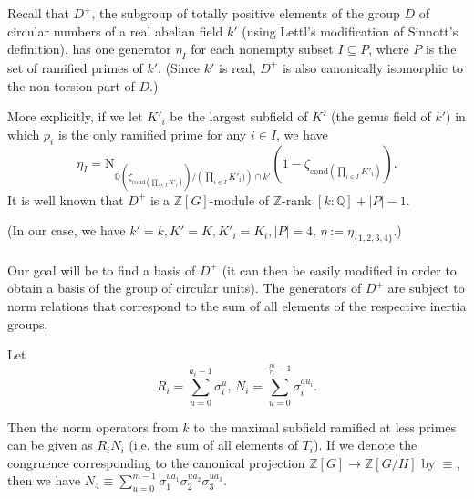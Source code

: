 \documentclass[12pt,a4paper]{article}
\newcommand{\Qbb}{\mathbb{Q}}
\newcommand{\Zbb}{\mathbb{Z}}
\newcommand{\Z}{\mathbb{Z}}
\begin{document}
Recall that $D^+$, the subgroup of totally positive elements of the group $D$ of circular numbers of a real abelian field $k'$ (using Lettl's modification of Sinnott's definition), has one generator $\eta_I$ for each nonempty subset $I\subseteq P$, where $P$ is the set of ramified primes of $k'$. (Since $k'$ is real, $D^+$ is also canonically isomorphic to the non-torsion part of $D$.) 

More explicitly, if we let $K'_i$ be the largest subfield of $K'$ (the genus field of $k'$) in which $p_i$ is the only ramified prime for any $i\in I$, we have
$$\eta_I=\text{N}_{\Qbb(\zeta_{\text{cond} \left(\prod_{i\in I}K'_i\right)})/\left(\prod_{i\in I}K'_i)\right)\cap k'}\left(1-\zeta_{\text{cond} \left(\prod_{i\in I}K'_i\right)}\right).$$
It is well known that $D^+$ is a $\Zbb[G]$-module of $\Zbb$-rank $[k:\Qbb]+|P|-1$. 

(In our case, we have $k'=k, K'=K, K'_i=K_i, |P|=4$, $\eta:=\eta_{\{1,2,3,4\}}$.)


\paragraph*{}
Our goal will be to find a basis of $D^+$ (it can then be easily modified in order to obtain a basis of the group of circular units). The generators of $D^+$ are subject to norm relations that correspond to the sum of all elements of the respective inertia groups.

Let $$R_i=\sum_{u=0}^{a_i-1}\sigma_i^u,\, N_i=\sum_{u=0}^{\frac{m}{r_i}-1}\sigma_i^{au_i}.$$ 

Then the norm operators from $k$ to the maximal subfield ramified at less primes can be given as $R_iN_i$ (i.e. the sum of all elements of $T_i$). If we denote the congruence corresponding to the canonical projection $\Z[G]\to \Z[G/H]$ by $\equiv$, then we have $N_4\equiv \sum_{u=0}^{m-1}\sigma_1^{ua_1}\sigma_2^{ua_2}\sigma_3^{ua_3}$.
\end{document}
